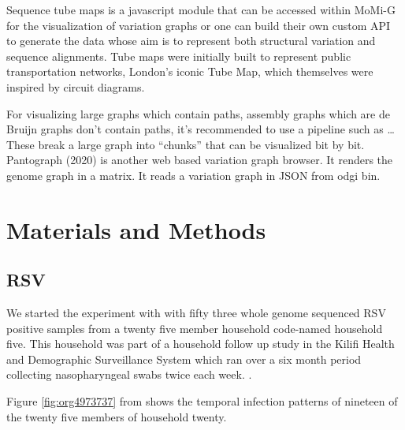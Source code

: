 \documentclass[10pt, a4paper]{article}
\begin{document}
Sequence tube maps \cite{beyerSequenceTubeMaps2019} is a javascript module that
can be accessed within MoMi-G for the visualization of variation graphs or one
can  build their own custom API to generate the data whose aim is to represent
both structural variation and sequence alignments.
Tube maps were initially built to represent public transportation networks,
London’s iconic Tube Map, \cite{cartwrightamBeckRepresentationLondon2012} which
themselves were inspired by circuit diagrams.

For visualizing large graphs which contain paths, assembly graphs which are de
Bruijn graphs don’t contain paths, it’s recommended to use a pipeline such as …
These break a large graph into “chunks” that can be visualized bit by bit.
Pantograph (2020) is another web based variation graph browser.
It renders the genome graph in a matrix. It reads a variation graph in JSON from
odgi bin.


\newpage
\section{Materials and Methods}
\label{sec:org0102815}
\subsection{RSV}
\label{sec:org2221174}
We started the experiment with with fifty three whole genome sequenced RSV 
positive samples from a twenty five member household code-named household five.
This household was part of a household follow up study in the Kilifi Health and 
Demographic Surveillance System which ran over a six month
period collecting nasopharyngeal swabs twice each week. 
\cite{munywokiInfluenceAgeSeverity2015,agotiTransmissionPatternsEvolution2017,githinjiAssessingUtilityMinority2018}.

Figure \ref{fig:org4973737} from
\cite{githinjiAssessingUtilityMinority2018} shows the temporal infection patterns
of nineteen of the twenty five members of household twenty.
\end{document}
